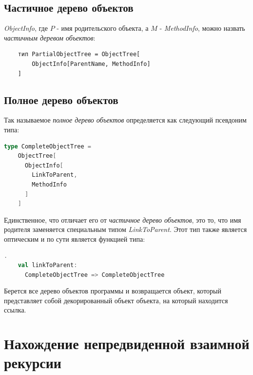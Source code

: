 \subsection{Частичное дерево объектов}
\textit{ObjectInfo}, где $P$ - имя родительского объекта, а $M$ - \textit{MethodInfo}, можно назвать \textit{частичным деревом объектов}:
\begin{lstlisting}
    тип PartialObjectTree = ObjectTree[
        ObjectInfo[ParentName, MethodInfo]
    ]

\end{lstlisting}

\subsection{Полное дерево объектов}
\label{impl:complete_object_tree}
Так называемое \textit{полное дерево объектов} определяется как следующий псевдоним типа:
\begin{lstlisting}[language=Scala]
  type CompleteObjectTree =
    ObjectTree[
      ObjectInfo[
        LinkToParent,
        MethodInfo
      ]
    ]
\end{lstlisting}
Единственное, что отличает его от \textit{частичное дерево объектов}, это то, что имя родителя заменяется специальным типом \textit{LinkToParent}. Этот тип также является оптическим \cite{optics} и по сути является функцией типа:
\begin{lstlisting}[language=Scala].
    val linkToParent: 
      CompleteObjectTree => CompleteObjectTree
\end{lstlisting}
Берется все дерево объектов программы и возвращается объект, который представляет собой декорированный объект объекта, на который находится ссылка.



\section{Нахождение непредвиденной взаимной рекурсии}
\label{impl:mutualrec}

